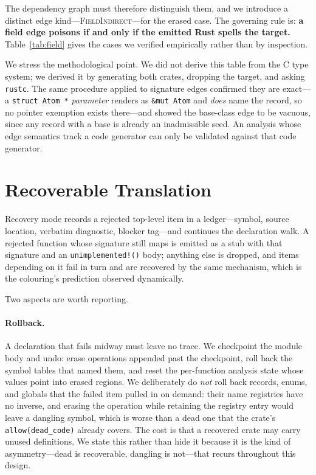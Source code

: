 \documentclass[10pt,twocolumn]{article}
\begin{document}
The dependency graph must therefore distinguish them, and we introduce a
distinct edge kind---\textsc{FieldIndirect}---for the erased case. The
governing rule is: \textbf{a field edge poisons if and only if the emitted
Rust spells the target.} Table~\ref{tab:field} gives the cases we verified
empirically rather than by inspection.



We stress the methodological point. We did not derive this table from the C
type system; we derived it by generating both crates, dropping the target, and
asking \texttt{rustc}. The same procedure applied to signature edges confirmed
they are exact---a \texttt{struct Atom *} \emph{parameter} renders as
\texttt{\&mut Atom} and \emph{does} name the record, so no pointer exemption
exists there---and showed the base-class edge to be vacuous, since any record
with a base is already an inadmissible seed. An analysis whose edge semantics
track a code generator can only be validated against that code generator.

\section{Recoverable Translation}
\label{sec:recovery}

Recovery mode records a rejected top-level item in a ledger---symbol, source
location, verbatim diagnostic, blocker tag---and continues the declaration
walk. A rejected function whose signature still maps is emitted as a stub with
that signature and an \texttt{unimplemented!()} body; anything else is dropped,
and items depending on it fail in turn and are recovered by the same
mechanism, which is the colouring's prediction observed dynamically.

Two aspects are worth reporting.

\paragraph{Rollback.} A declaration that fails midway must leave no trace. We
checkpoint the module body and undo: erase operations appended past the
checkpoint, roll back the symbol tables that named them, and reset the
per-function analysis state whose values point into erased regions. We
deliberately do \emph{not} roll back records, enums, and globals that the
failed item pulled in on demand: their name registries have no inverse, and
erasing the operation while retaining the registry entry would leave a
dangling symbol, which is worse than a dead one that the crate's
\texttt{allow(dead\_code)} already covers. The cost is that a recovered crate
may carry unused definitions. We state this rather than hide it because it is
the kind of asymmetry---dead is recoverable, dangling is not---that recurs
throughout this design.
\end{document}
